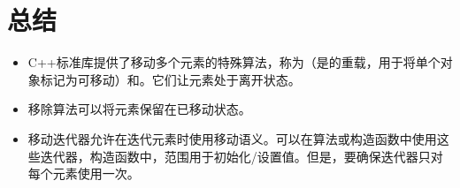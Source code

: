 \section{总结}
\begin{itemize}
	\item C++标准库提供了移动多个元素的特殊算法，称为（是的重载，用于将单个对象标记为可移动）和。它们让元素处于离开状态。
	\item 移除算法可以将元素保留在已移动状态。
	\item 移动迭代器允许在迭代元素时使用移动语义。可以在算法或构造函数中使用这些迭代器，构造函数中，范围用于初始化/设置值。但是，要确保迭代器只对每个元素使用一次。
\end{itemize}


